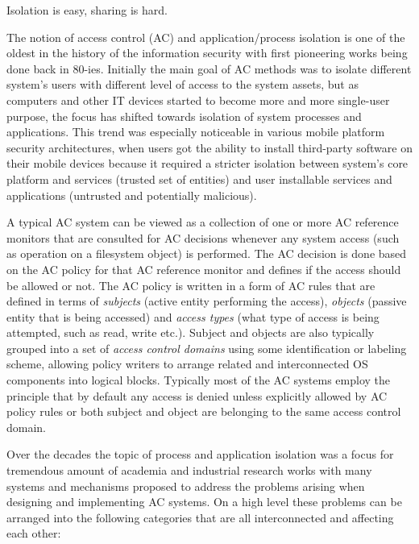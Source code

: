 \begin{quoting}
Isolation is easy, sharing is hard.
\end{quoting}


The notion of access control (AC) and application/process isolation is one of the oldest in the history of the information security with first pioneering works being done back in 80-ies. Initially the main goal of AC methods was to isolate different system's users with different level of access to the system assets, but as computers and other IT devices started to become more and more single-user purpose, the focus has shifted towards isolation of system processes and applications. This trend was especially noticeable in various mobile platform security architectures, when users got the ability to install third-party software on their mobile devices because it required a stricter isolation between system's core platform and services (trusted set of entities) and user installable services and applications (untrusted and potentially malicious).

A typical AC system can be viewed as a collection of one or more AC reference monitors that are consulted for AC decisions whenever any system access (such as operation on a filesystem object) is performed. The AC decision is done based on the AC policy for that AC reference monitor and defines if the access should be allowed or not. The AC policy is written in a form of AC rules that are defined in terms of \textit{subjects} (active entity performing the access), \textit{objects} (passive entity that is being accessed) and \textit{access types} (what type of access is being attempted, such as read, write etc.). Subject and objects are also typically grouped into a set of \textit{access control domains} using some identification or labeling scheme, allowing policy writers to arrange related and interconnected OS components into logical blocks. Typically most of the AC systems employ the principle that by default any access is denied unless explicitly allowed by AC policy rules or both subject and object are belonging to the same access control domain.
 
Over the decades the topic of process and application isolation was a focus for tremendous amount of academia and industrial research works with many systems and mechanisms proposed to address the problems arising when designing and implementing AC systems. On a high level these problems can be arranged into the following categories that are all interconnected and affecting each other: 

